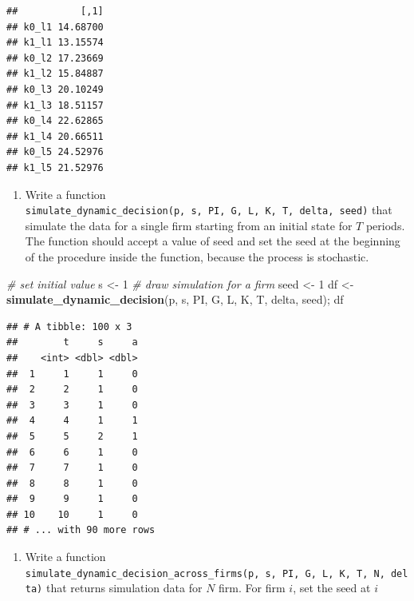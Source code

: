 \documentclass[]{book}
\newenvironment{Shaded}{\begin{snugshade}}{\end{snugshade}}
\newcommand{\KeywordTok}[1]{\textcolor[rgb]{0.13,0.29,0.53}{\textbf{#1}}}
\newcommand{\DecValTok}[1]{\textcolor[rgb]{0.00,0.00,0.81}{#1}}
\newcommand{\StringTok}[1]{\textcolor[rgb]{0.31,0.60,0.02}{#1}}
\newcommand{\CommentTok}[1]{\textcolor[rgb]{0.56,0.35,0.01}{\textit{#1}}}
\newcommand{\OperatorTok}[1]{\textcolor[rgb]{0.81,0.36,0.00}{\textbf{#1}}}
\newcommand{\NormalTok}[1]{#1}
\providecommand{\tightlist}{%
  \setlength{\itemsep}{0pt}\setlength{\parskip}{0pt}}
\begin{document}
\begin{Shaded}
\end{Shaded}

\begin{verbatim}
##           [,1]
## k0_l1 14.68700
## k1_l1 13.15574
## k0_l2 17.23669
## k1_l2 15.84887
## k0_l3 20.10249
## k1_l3 18.51157
## k0_l4 22.62865
## k1_l4 20.66511
## k0_l5 24.52976
## k1_l5 21.52976
\end{verbatim}

\begin{enumerate}
\def\labelenumi{\arabic{enumi}.}
\setcounter{enumi}{5}
\tightlist
\item
  Write a function
  \texttt{simulate\_dynamic\_decision(p,\ s,\ PI,\ G,\ L,\ K,\ T,\ delta,\ seed)}
  that simulate the data for a single firm starting from an initial
  state for \(T\) periods. The function should accept a value of seed
  and set the seed at the beginning of the procedure inside the
  function, because the process is stochastic.
\end{enumerate}

\begin{Shaded}
\begin{Highlighting}[]
\CommentTok{# set initial value}
\NormalTok{s <-}\StringTok{ }\DecValTok{1}
\CommentTok{# draw simulation for a firm}
\NormalTok{seed <-}\StringTok{ }\DecValTok{1}
\NormalTok{df <-}\StringTok{ }\KeywordTok{simulate_dynamic_decision}\NormalTok{(p, s, PI, G, L, K, T, delta, seed); df}
\end{Highlighting}
\end{Shaded}

\begin{verbatim}
## # A tibble: 100 x 3
##        t     s     a
##    <int> <dbl> <dbl>
##  1     1     1     0
##  2     2     1     0
##  3     3     1     0
##  4     4     1     1
##  5     5     2     1
##  6     6     1     0
##  7     7     1     0
##  8     8     1     0
##  9     9     1     0
## 10    10     1     0
## # ... with 90 more rows
\end{verbatim}

\begin{enumerate}
\def\labelenumi{\arabic{enumi}.}
\setcounter{enumi}{6}
\tightlist
\item
  Write a function
  \texttt{simulate\_dynamic\_decision\_across\_firms(p,\ s,\ PI,\ G,\ L,\ K,\ T,\ N,\ delta)}
  that returns simulation data for \(N\) firm. For firm \(i\), set the
  seed at \(i\)
\end{enumerate}
\end{document}
